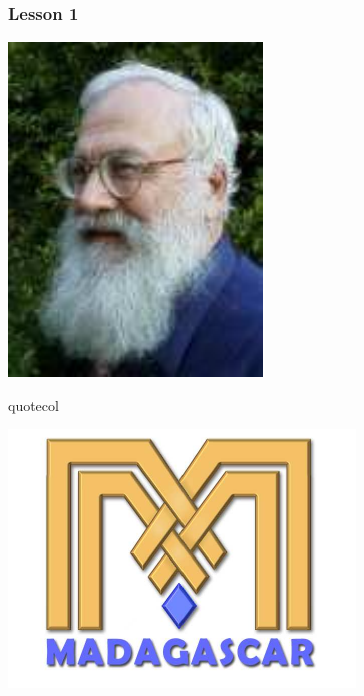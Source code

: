 \begin{frame}
  \MadLogo
  \frametitle{Lesson 1}
{\flushright
  \includegraphics[height=0.2\textheight]{Fig/Claerbout}
  } 
\vfill
\begin{beamercolorbox}[wd=\textwidth,center]{quotecol}
\Large {}
\end{beamercolorbox}
\vfill

\end{frame}

\begin{frame}
  \begin{center}
 \includegraphics[height=0.5\textheight]{Fig/MadLogo} \\
 {} 
  \end{center}
\end{frame}

